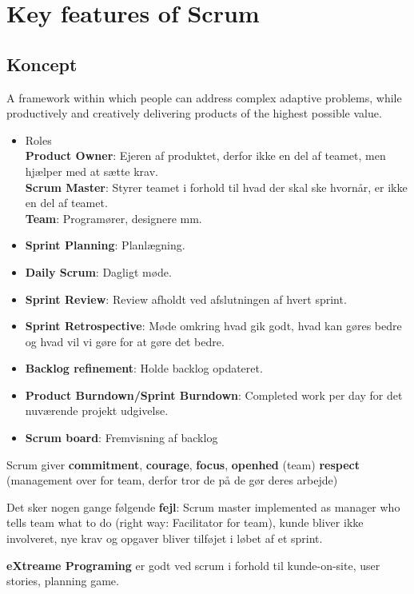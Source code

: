 \documentclass[11pt,a4paper]{article}
\begin{document}
\newpage
\section{Key features of Scrum}
\subsection{Koncept}
A framework within which people can address complex adaptive problems, while productively and creatively delivering products of the highest possible value.
\begin{itemize}
\item Roles\\ \textbf{Product Owner}: Ejeren af produktet, derfor ikke en del af teamet, men hjælper med at sætte krav.\\ \textbf{Scrum Master}: Styrer teamet i forhold til hvad der skal ske hvornår, er ikke en del af teamet.\\ \textbf{Team}: Programører, designere mm.
\item \textbf{Sprint Planning}: Planlægning.
\item \textbf{Daily Scrum}: Dagligt møde.
\item \textbf{Sprint Review}: Review afholdt ved afslutningen af hvert sprint.
\item \textbf{Sprint Retrospective}: Møde omkring hvad gik godt, hvad kan gøres bedre og hvad vil vi gøre for at gøre det bedre.
\item \textbf{Backlog refinement}: Holde backlog opdateret.
\item \textbf{Product Burndown/Sprint Burndown}: Completed work per day for det nuværende projekt udgivelse.
\item \textbf{Scrum board}: Fremvisning af backlog
\end{itemize}
Scrum giver \textbf{commitment}, \textbf{courage}, \textbf{focus}, \textbf{openhed} (team) \textbf{respect} (management over for team, derfor tror de på de gør deres arbejde)

Det sker nogen gange følgende \textbf{fejl}: Scrum master implemented as manager who tells team what to do (right way: Facilitator for team), kunde bliver ikke involveret, nye krav og opgaver bliver tilføjet i løbet af et sprint.

\textbf{eXtreame Programing} er godt ved scrum i forhold til kunde-on-site, user stories, planning game.
\end{document}
